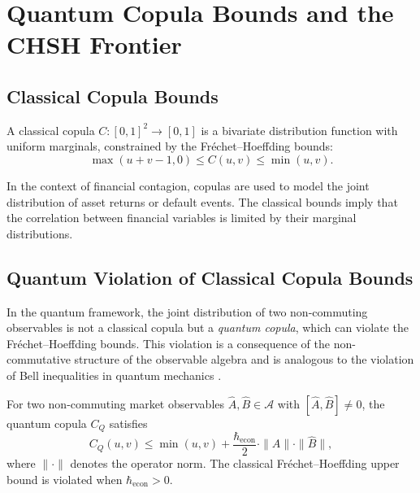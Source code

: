 
\section{Quantum Copula Bounds and the CHSH Frontier}\label{app:copula-chsh}

\subsection{Classical Copula Bounds}

A classical copula $C : [0, 1]^2 \to [0, 1]$ is a bivariate distribution function
with uniform marginals, constrained by the Fr\'echet--Hoeffding bounds:
\begin{equation*}
    \max(u + v - 1, 0) \leq C(u, v) \leq \min(u, v).
\end{equation*}

In the context of financial contagion, copulas are used to model the joint
distribution of asset returns or default events. The classical bounds imply that
the correlation between financial variables is limited by their marginal
distributions.

\subsection{Quantum Violation of Classical Copula Bounds}

In the quantum framework, the joint distribution of two non-commuting observables
is not a classical copula but a \emph{quantum copula}, which can violate the
Fr\'echet--Hoeffding bounds. This violation is a consequence of the
non-commutative structure of the observable algebra and is analogous to the
violation of Bell inequalities in quantum mechanics
\citep{clauser1969proposed,fine1982hidden}.

\begin{theorem}\label{thm:quantum-copula}
For two non-commuting market observables $\hat{A}, \hat{B} \in \mathcal{A}$ with
$[\hat{A}, \hat{B}] \neq 0$, the quantum copula $C_Q$ satisfies
\begin{equation*}
    C_Q(u, v) \leq \min(u, v) + \frac{\hbar_{\mathrm{econ}}}{2}
    \cdot \|\hat{A}\| \cdot \|\hat{B}\|,
\end{equation*}
where $\|\cdot\|$ denotes the operator norm. The classical Fr\'echet--Hoeffding
upper bound is violated when $\hbar_{\mathrm{econ}} > 0$.
\end{theorem}

